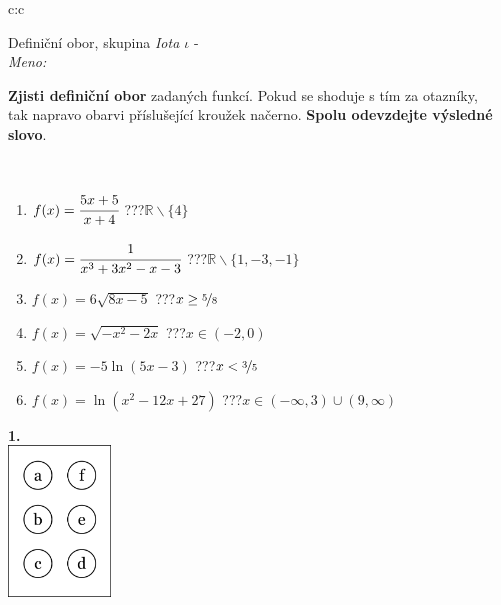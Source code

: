 \documentclass[10pt]{report}
\begin{document}
\begin{tabular}{c:c}
\begin{minipage}[c][104.5mm][t]{0.5\linewidth}
\begin{center}
\vspace{7mm}
{\huge Definiční obor, skupina \textit{Iota $\iota$} -}\\[5mm]
\textit{Meno:}\phantom{xxxxxxxxxxxxxxxxxxxxxxxxxxxxxxxxxxxxxxxxxxxxxxxxxxxxxxxxxxxxxxxxx}\\[5mm]
\begin{minipage}{0.95\linewidth}
\textbf{Zjisti definiční obor} zadaných funkcí. Pokud se shoduje s tím za otazníky,\\tak napravo obarvi příslušející kroužek načerno. \textbf{Spolu odevzdejte výsledné slovo}.
\end{minipage}
\\[1mm]
\begin{minipage}{0.79\linewidth}
\begin{center}
\begin{varwidth}{\linewidth}
\begin{enumerate}
\normalsizerrr
\item $f(x)=\cfrac{5x+5}{x+4}$\quad \dotfill\; ???\;\dotfill \quad $\mathbb{R}\smallsetminus\{4\}$
\item $f(x)=\cfrac{1}{x^3+3x^2-x-3}$\quad \dotfill\; ???\;\dotfill \quad $\mathbb{R}\smallsetminus\{1,-3,-1\}$
\item $f(x)=6\sqrt{8x-5}$\quad \dotfill\; ???\;\dotfill \quad $x\geq\nicefrac{5}{8}$
\item $f(x)=\sqrt{-x^2-2x}$\quad \dotfill\; ???\;\dotfill \quad $x\in(-2 , 0)$
\item $f(x)=-5\ln{(5x-3)}$\quad \dotfill\; ???\;\dotfill \quad $x<\nicefrac{3}{5}$
\item $f(x)=\ln{(x^2-12x+27)}$\quad \dotfill\; ???\;\dotfill \quad $x\in(-\infty , 3)\cup(9 , \infty)$
\end{enumerate}
\end{varwidth}
\end{center}
\end{minipage}
\begin{minipage}{0.20\linewidth}
\begin{center}
{\Huge\bfseries 1.} \\[2mm]
\includegraphics[height=40mm]{../images/braille.png}

\end{center}
\end{minipage}
\end{center}
\end{minipage}
\end{tabular}
\end{document}
